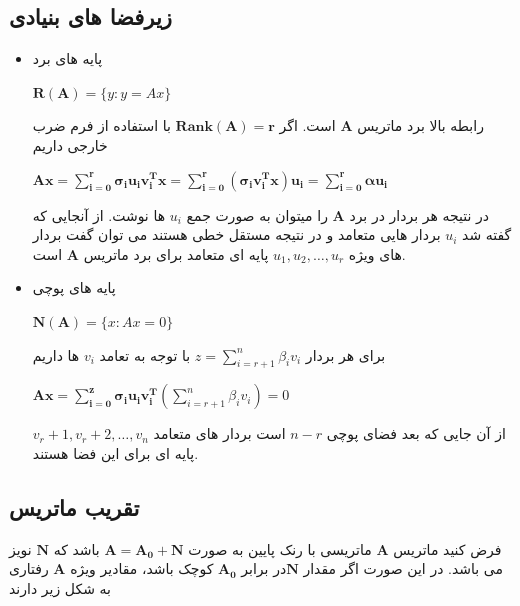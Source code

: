 	\subsection{زیرفضا های بنیادی}
	\label{sec:fun_sub}
	\begin{itemize}
		\item{ پایه های برد } \\
	\begin{center}
	$ \mathbf{ R(A) } = \{y: y = Ax \} $ 
	\end{center}
	رابطه بالا برد ماتریس $\mathbf{A} $ است. اگر $ \mathbf{Rank(A) = r } $ با استفاده از فرم ضرب خارجی داریم 
	\begin{center}
	$\mathbf{Ax = \sum_{i=0}^{r} \sigma_{i}u_iv_i^Tx =\sum_{i=0}^{r} \left(\sigma_{i}v_i^Tx\right)u_i = \sum_{i=0}^{r}\alpha u_i } $
	\end{center}
	در نتیجه هر بردار در برد $\mathbf{A}$ را میتوان به صورت جمع $ u_i $ ها نوشت. از آنجایی که گفته شد $ u_i $ بردار هایی متعامد و در نتیجه مستقل خطی هستند می توان گفت بردار های ویژه $ u_1, u_2, \ldots, u_r $ پایه ای متعامد برای برد ماتریس $ \mathbf{A} $ است. \\
	\item{ پایه های پوچی } \\
	\begin{center}
	$ \mathbf{ N(A) } = \{x: Ax=0 \} $ 
	\end{center}
	برای هر بردار  $ z = \sum_{i=r+1}^n\beta_i v_i $ با توجه به تعامد $v_i$ ها داریم
	\begin{center}
		$\mathbf{Ax = \sum_{i=0}^{z} \sigma_{i}u_iv_i^T}\left( \sum_{i=r+1}^n\beta_i v_i \right)=0 $
	\end{center}
	از آن جایی که بعد فضای پوچی $ n - r $ است بردار های متعامد $ v_r+1, v_r+2, \ldots, v_n $پایه ای برای این فضا هستند.
	\end{itemize}
	\pagebreak
	\subsection{تقریب ماتریس}
	
	فرض کنید ماتریس $ \mathbf{A} $ ماتریسی با رنک پایین به صورت $\mathbf{A= A_0 + N} $ باشد که $\mathbf{ N }$ نویز می باشد. در این صورت اگر مقدار $ \mathbf{N} $در برابر $ \mathbf{A_0} $ کوچک باشد،‌ مقادیر ویژه $ \mathbf{A}$ رفتاری به شکل زیر دارند 
	

